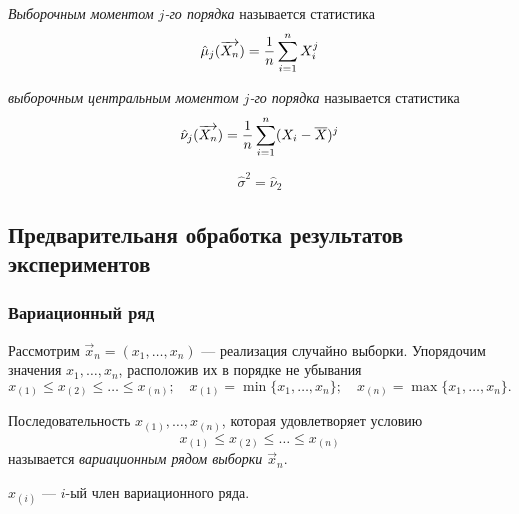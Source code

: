 \begin{defn}
	\emph{Выборочным моментом $j$-го порядка} называется статистика
	\begin{equation}
		\hat{\mu}_j(\overrightarrow{X_n}) = \frac{1}{n} \sum_{i = 1}^{n} X_i^j
	\end{equation}
\end{defn}

\begin{defn}
	\emph{выборочным центральным моментом $j$-го порядка} называется статистика
	\[
		\hat{\nu}_j(\overrightarrow{X_n}) = \frac{1}{n} \sum_{i = 1}^{n} (X_i - \overline{X})^j
	\]
\end{defn}
\begin{rem}
	\begin{equation}
		\hat{\sigma}^2 = \hat{\nu}_2
	\end{equation}
\end{rem}


\subsection{Предварительаня обработка результатов экспериментов}

\subsubsection{Вариационный ряд}

Рассмотрим $\vec{x}_n = (x_1, \dots, x_n)$ --- реализация случайно выборки. Упорядочим значения $x_1, \dots, x_n$, расположив их в порядке не убывания
\[
	x_{(1)} \leq x_{(2)} \leq \dots \leq x_{(n)}; \quad x_{(1)} = \min \{ x_1, \dots, x_n \}; \quad x_{(n)} = \max \{ x_1, \dots, x_n \}.
\]

\begin{defn}
	Последовательность $x_{(1)}, \dots, x_{(n)}$, которая удовлетворяет условию 
	\[
		x_{(1)} \leq x_{(2)} \leq \dots \leq x_{(n)}
	\] 
	называется \emph{вариационным рядом выборки $\vec{x}_n$}.
\end{defn}
\begin{rem}
	$x_{(i)}$ --- $i$-ый член вариационного ряда.
\end{rem}

